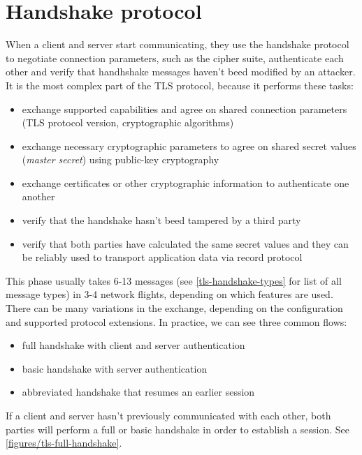 \section{Handshake protocol}
\label{toc/tls-handshake}

When a client and server start communicating, they use the handshake protocol to negotiate connection parameters, such as the cipher suite, authenticate each other and verify that handhshake messages haven't beed modified by an attacker. It is the most complex part of the TLS protocol, because it performs these tasks:

\begin{itemize}
  \item exchange supported capabilities and agree on shared connection parameters (TLS protocol version, cryptographic algorithms)
  \item exchange necessary cryptographic parameters to agree on shared secret values (\textit{master secret}) using public-key cryptography
  \item exchange certificates or other cryptographic information to authenticate one another
  \item verify that the handshake hasn't beed tampered by a third party
  \item verify that both parties have calculated the same secret values and they can be reliably used to transport application data via record protocol
\end{itemize}

This phase usually takes 6-13 messages (see \autoref{tls-handshake-types} for list of all message types) in 3-4 network flights, depending on which features are used. There can be many variations in the exchange, depending on the configuration and supported protocol extensions. In practice, we can see three common flows:

\begin{itemize}
  \item full handshake with client and server authentication
  \item basic handshake with server authentication
  \item abbreviated handshake that resumes an earlier session
\end{itemize}




If a client and server hasn't previously communicated with each other, both parties will perform a full or basic handshake in order to establish a session. See \autoref{figures/tls-full-handshake}.

